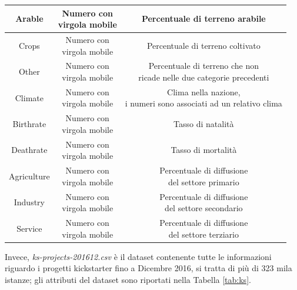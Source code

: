 \begin{table}
\begin{tabular}{|c|c|c|}
		\hline  
		\rule{0pt}{24pt}Arable & \shortstack{Numero con \\ virgola mobile} & Percentuale di terreno arabile \\ 
		\hline  
		\rule{0pt}{24pt}Crops & \shortstack{Numero con \\ virgola mobile} & Percentuale di terreno coltivato \\ 
		\hline  
		\rule{0pt}{24pt}Other & \shortstack{Numero con \\ virgola mobile} & \shortstack{Percentuale di terreno che non\\ ricade nelle due categorie precedenti} \\ 
		\hline  
		\rule{0pt}{24pt}Climate & \shortstack{Numero con \\ virgola mobile} & \shortstack{Clima nella nazione, \\ i numeri sono associati ad un relativo clima}  \\ 
		\hline  
		\rule{0pt}{24pt}Birthrate & \shortstack{Numero con \\ virgola mobile} & Tasso di natalità \\ 
		\hline  
		\rule{0pt}{24pt}Deathrate & \shortstack{Numero con \\ virgola mobile} & Tasso di mortalità \\ 
		\hline  
		\rule{0pt}{24pt}Agriculture & \shortstack{Numero con \\ virgola mobile} & \shortstack{Percentuale di diffusione \\ del settore primario} \\ 
		\hline  
		\rule{0pt}{24pt}Industry & \shortstack{Numero con \\ virgola mobile} & \shortstack{Percentuale di diffusione \\ del settore secondario} \\ 
		\hline   
		\rule{0pt}{24pt}Service & \shortstack{Numero con \\ virgola mobile} & \shortstack{Percentuale di diffusione \\ del settore terziario} \\ 
		\hline  
	\end{tabular}
\end{table} 
Invece, \textit{ks-projects-201612.csv} è il dataset contenente tutte le informazioni riguardo i progetti kickstarter fino a Dicembre 2016, si tratta di più di 323 mila istanze; gli attributi del dataset sono riportati nella Tabella \ref{tab:ks}.

